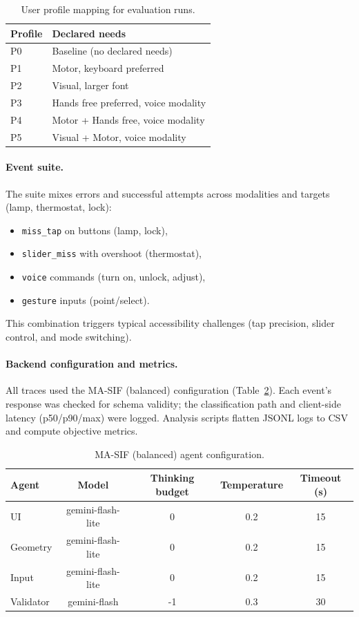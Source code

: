 \documentclass[openany]{book}
\begin{document}
\begin{table}[h]
\centering
\caption{User profile mapping for evaluation runs.}
\begin{tabular}{ll}
\toprule
\textbf{Profile} & \textbf{Declared needs} \\
\midrule
P0 & Baseline (no declared needs) \\
P1 & Motor, keyboard preferred \\
P2 & Visual, larger font \\
P3 & Hands free preferred, voice modality \\
P4 & Motor + Hands free, voice modality \\
P5 & Visual + Motor, voice modality \\
\bottomrule
\end{tabular}
\label{tab:user-profile-mapping}
\end{table}

\paragraph{Event suite.}
The suite mixes errors and successful attempts across modalities and targets (lamp, thermostat, lock):
\begin{itemize}
  \item \texttt{miss\_tap} on buttons (lamp, lock),
  \item \texttt{slider\_miss} with overshoot (thermostat),
  \item \texttt{voice} commands (turn on, unlock, adjust),
  \item \texttt{gesture} inputs (point/select).
\end{itemize}
This combination triggers typical accessibility challenges (tap precision, slider control, and mode switching).

\paragraph{Backend configuration and metrics.}
All traces used the MA-SIF (balanced) configuration (Table~\ref{tab:ma-sif-config}). Each event’s response was checked for schema validity; the classification path and client-side latency (p50/p90/max) were logged. Analysis scripts flatten JSONL logs to CSV and compute objective metrics.

\begin{table}[htb]
\centering
\caption{MA-SIF (balanced) agent configuration.}
\label{tab:ma-sif-config}
\begin{tabular}{lcccc}
\toprule
\textbf{Agent} & \textbf{Model} & \textbf{Thinking budget} & \textbf{Temperature} & \textbf{Timeout (s)} \\
\midrule
UI         & gemini-flash-lite & 0   & 0.2 & 15 \\
Geometry   & gemini-flash-lite & 0   & 0.2 & 15 \\
Input      & gemini-flash-lite & 0   & 0.2 & 15 \\
Validator  & gemini-flash      & -1  & 0.3 & 30 \\
\bottomrule
\end{tabular}
\end{table}
\end{document}
